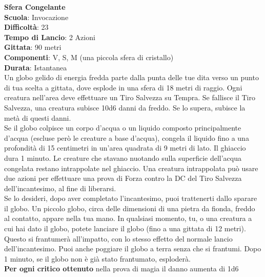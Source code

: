 \begin{multicols}{2}
\medskip\textbf{Sfera Congelante}\\
\textbf{Scuola}: Invocazione\\
\textbf{Difficoltà}: 23\\
\textbf{Tempo di Lancio}: 2 Azioni\\
\textbf{Gittata}: 90 metri\\
\textbf{Componenti}: V, S, M (una piccola sfera di cristallo)\\
\textbf{Durata}: Istantanea\\
Un globo gelido di energia fredda parte dalla punta delle tue dita verso un punto di tua scelta a gittata, dove esplode in una sfera di 18 metri di raggio. Ogni creatura nell'area deve effettuare un Tiro Salvezza su Tempra. Se fallisce il Tiro Salvezza, una creatura subisce 10d6 danni da freddo. Se lo supera, subisce la metà di questi danni.\\
Se il globo colpisce un corpo d'acqua o un liquido composto principalmente d'acqua (escluse però le creature a base d'acqua), congela il liquido fino a una profondità di 15 centimetri in un'area quadrata di 9 metri di lato. Il ghiaccio dura 1 minuto. Le creature che stavano nuotando sulla superficie dell'acqua congelata restano intrappolate nel ghiaccio. Una creatura intrappolata può usare due azioni per effettuare una prova di Forza contro la DC del Tiro Salvezza dell'incantesimo, al fine di liberarsi.\\
Se lo desideri, dopo aver completato l'incantesimo, puoi trattenerti dallo sparare il globo. Un piccolo globo, circa delle dimensioni di una pietra da fionda, freddo al contatto, appare nella tua mano. In qualsiasi momento, tu, o una creatura a cui hai dato il globo, potete lanciare il globo (fino a una gittata di 12 metri). Questo si frantumerà all'impatto, con lo stesso effetto del normale lancio dell'incantesimo. Puoi anche poggiare il globo a terra senza che si frantumi. Dopo 1 minuto, se il globo non è già stato frantumato, esploderà.\\
\textbf{Per ogni critico ottenuto} nella prova di magia il danno aumenta di 1d6


\end{multicols}
